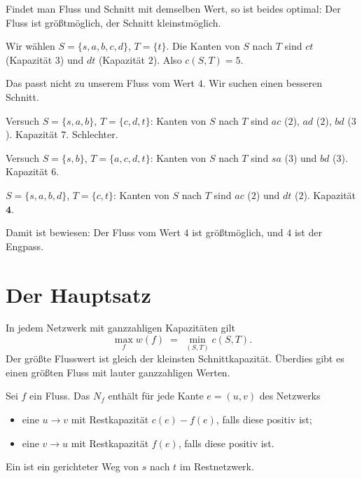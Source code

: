 \begin{merksatz}
Findet man  Fluss und  Schnitt mit demselben Wert, so ist beides optimal: Der Fluss ist größtmöglich, der Schnitt kleinstmöglich.

Wir wählen $S = \{s, a, b, c, d\}$, $T = \{t\}$. Die Kanten von $S$ nach $T$ sind $ct$ (Kapazität $3$) und $dt$ (Kapazität $2$). Also $c(S,T) = 5$.

Das passt nicht zu unserem Fluss vom Wert $4$. Wir suchen einen besseren Schnitt.

Versuch $S = \{s, a, b\}$, $T = \{c,d,t\}$: Kanten von $S$ nach $T$ sind $ac$ ($2$), $ad$ ($2$), $bd$ ($3$). Kapazität $7$. Schlechter.

Versuch $S = \{s,b\}$, $T = \{a,c,d,t\}$: Kanten von $S$ nach $T$ sind $sa$ ($3$) und $bd$ ($3$). Kapazität $6$.

$S = \{s, a, b, d\}$, $T = \{c, t\}$: Kanten von $S$ nach $T$ sind $ac$ ($2$) und $dt$ ($2$). Kapazität $\mathbf{4}$.

Damit ist bewiesen: Der Fluss vom Wert $4$ ist größtmöglich, und $4$ ist der Engpass. \checkmark
\end{merksatz}

\section{Der Hauptsatz}

\begin{merksatz}
In jedem Netzwerk mit ganzzahligen Kapazitäten gilt
\[ \max_f w(f) \;=\; \min_{(S,T)} c(S,T) . \]
Der größte Flusswert ist gleich der kleinsten Schnittkapazität. Überdies gibt es einen größten Fluss mit lauter ganzzahligen Werten.
\end{merksatz}

\begin{definition}
Sei $f$ ein Fluss. Das  $N_f$ enthält für jede Kante $e = (u,v)$ des Netzwerks
\begin{itemize}[leftmargin=1.4em, itemsep=3pt]
\item eine  $u \to v$ mit Restkapazität $c(e) - f(e)$, falls diese positiv ist;
\item eine  $v \to u$ mit Restkapazität $f(e)$, falls diese positiv ist.
\end{itemize}
Ein  ist ein gerichteter Weg von $s$ nach $t$ im Restnetzwerk.
\end{definition}

